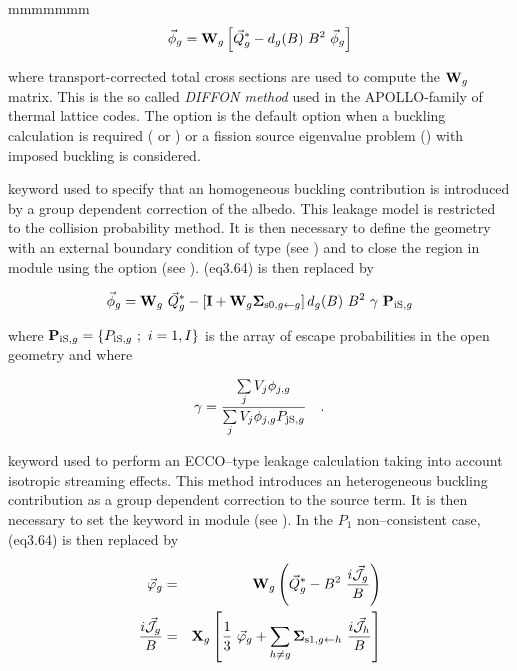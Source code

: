 \begin{ListeDeDescription}{mmmmmmm}
\begin{equation}
\vec\phi_g={\bf W}_g\left[ \vec Q^{*}_g-d_g(B) \ B^2 \ \vec\phi_g\right]
\label{eq:eq5.33}
\end{equation}

\noindent where transport-corrected total
cross sections are used to compute the ${\bf W}_g$ matrix. This is the so called
{\sl DIFFON method} used in the APOLLO-family of thermal lattice codes. The  option is
the default option when a buckling calculation is required ( or ) or a
fission source eigenvalue problem () with imposed buckling is considered.

\item[\moc{ALBS}] keyword used to specify that an homogeneous buckling
contribution is introduced by a group dependent correction of the
albedo.\cite{ALSB2} This leakage model is restricted to the collision probability
method. It is then necessary to define the geometry with an
external boundary condition of type  (see ) and to close
the region in module  using the  option (see
). \eq(eq3.64) is then replaced by

\begin{equation}
\vec\phi_g={\bf W}_g \ \vec Q^{*}_g-\left[ {\bf I}+{\bf W}_g{\bf \Sigma}_{{\rm s0},g\gets g}\right] d_g(B) \ B^2 
\ \gamma \ {\bf P}_{{\rm iS},g}
\label{eq:eq5.34}
\end{equation}

\noindent where ${\bf P}_{{\rm iS},g}=\{P_{{\rm iS},g} \ ; \ i=1,I \}$ is the array of escape
probabilities in the open geometry and where

\begin{equation}
\gamma={\sum\limits_j V_j \phi_{j,g} \over \sum\limits_j V_j \phi_{j,g} P_{{\rm jS},g}} \ \ \ .
\label{eq:eq5.35}
\end{equation}

\item[\moc{ECCO}] keyword used to perform an ECCO--type leakage
calculation taking into account isotropic streaming effects. This method
introduces an heterogeneous buckling contribution as a group dependent correction
to the source term.\cite{ecco,rimpault} It is then necessary to set the keyword 
in module  (see ). In the $P_1$ non--consistent case,
\eq(eq3.64) is then replaced by

\vskip -0.3cm

\begin{eqnarray}
\vec\varphi_g&=& {\bf W}_g \left(\vec Q^{*}_g - B^2 \ {i\vec{\cal J}_g\over B}\right)
\label{eq:eq5.37flux} \\
{i\vec{\cal J}_g\over B} &=& {\bf X}_g \left[{1 \over 3}
\ \vec\varphi_g + \sum_{h\not= g} {\bf \Sigma}_{{\rm s1},g \gets h} \
{i\vec{\cal J}_h\over B} \right]
\label{eq:eq5.37cour}
\end{eqnarray}


\end{ListeDeDescription}
